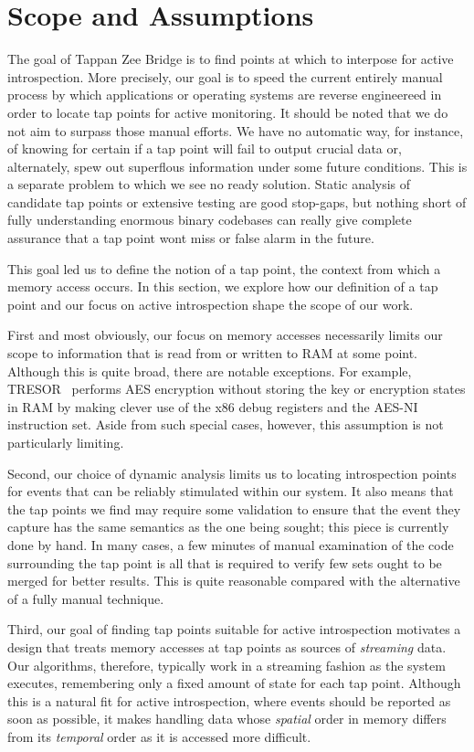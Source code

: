 \section{Scope and Assumptions}
\label{sec:scope}

The goal of Tappan Zee Bridge is to find points at which to interpose
for active introspection. More precisely, our goal is to speed the 
current entirely manual process by which applications or operating
systems are reverse engineereed in order to locate tap points for
active monitoring. It should be noted that we do not aim to surpass 
those manual efforts. We have no automatic way, for instance, of 
knowing for certain if a tap point will fail to output crucial data 
or, alternately, spew out superflous information under some future 
conditions. This is a separate problem to which we see no ready 
solution. Static analysis of candidate tap points or extensive
testing are good stop-gaps, but nothing short of fully understanding
enormous binary codebases can really give complete assurance that 
a tap point wont miss or false alarm in the future. 

This goal led us to define the notion of a tap
point, the context from which a memory access occurs. In this section,
we explore how our definition of a tap point and our focus on active
introspection shape the scope of our work.

First and most obviously, our focus on memory accesses necessarily
limits our scope to information that is read from or written to RAM at
some point. Although this is quite broad, there are notable exceptions.
For example, TRESOR~\cite{Muller:2011} performs AES encryption without
storing the key or encryption states in RAM by making clever use of the
x86 debug registers and the AES-NI instruction set. Aside from such
special cases, however, this assumption is not particularly limiting.

Second, our choice of dynamic analysis limits us to locating
introspection points for events that can be reliably stimulated within
our system. It also means that the tap points we find may require some
validation to ensure that the event they capture has the same semantics
as the one being sought; this piece is currently done by hand.
In many cases, a few minutes of manual examination of the code
surrounding the tap point is all that is required to verify few sets
ought to be merged for better results. This is quite reasonable
compared with the alternative of a fully manual technique.

Third, our goal of finding tap points suitable for active introspection
motivates a design that treats memory accesses at tap points as sources
of \emph{streaming} data. Our algorithms, therefore, typically work in a
streaming fashion as the system executes, remembering only a fixed
amount of state for each tap point. Although this is a natural fit for
active introspection, where events should be reported as soon as
possible, it makes handling data whose \emph{spatial} order in memory
differs from its \emph{temporal} order as it is accessed more difficult.

